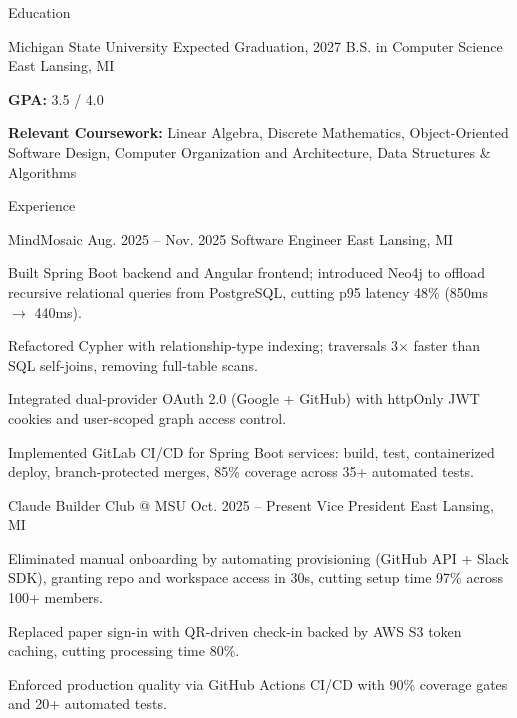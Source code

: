 \documentclass[
	11pt
]{../../../resume}
\begin{document}
	\begin{rSection}{E}{ducation}
		\begin{rSectionEntry}
			{Michigan State University}
			{Expected Graduation, 2027}
			{B.S. in Computer Science}
			{}
			{East Lansing, MI}

			\item \textbf{GPA:} 3.5 / 4.0
			\item \textbf{Relevant Coursework:} Linear Algebra, Discrete Mathematics, Object-Oriented Software Design, Computer Organization and Architecture, Data Structures \& Algorithms
		\end{rSectionEntry}
	\end{rSection}

	\begin{rSection}{E}{xperience}
		\begin{rSectionEntry}
			{MindMosaic}
			{Aug. 2025 -- Nov. 2025}
			{Software Engineer}
			{}
			{East Lansing, MI}

			\item Built Spring Boot backend and Angular frontend; introduced Neo4j to offload recursive relational queries from PostgreSQL, cutting p95 latency 48\% (850ms $\rightarrow$ 440ms).
			\item Refactored Cypher with relationship-type indexing; traversals 3$\times$ faster than SQL self-joins, removing full-table scans.
			\item Integrated dual-provider OAuth 2.0 (Google + GitHub) with httpOnly JWT cookies and user-scoped graph access control.
			\item Implemented GitLab CI/CD for Spring Boot services: build, test, containerized deploy, branch-protected merges, 85\% coverage across 35+ automated tests.
		\end{rSectionEntry}

		\begin{rSectionEntry}
			{Claude Builder Club @ MSU}
			{Oct. 2025 -- Present}
			{Vice President}
			{}
			{East Lansing, MI}

			\item Eliminated manual onboarding by automating provisioning (GitHub API + Slack SDK), granting repo and workspace access in 30s, cutting setup time 97\% across 100+ members.
			\item Replaced paper sign-in with QR-driven check-in backed by AWS S3 token caching, cutting processing time 80\%.
			\item Enforced production quality via GitHub Actions CI/CD with 90\% coverage gates and 20+ automated tests.
		\end{rSectionEntry}
	\end{rSection}
\end{document}
